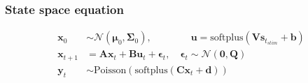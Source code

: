 \documentclass[11pt,letterpaper]{article} %
\begin{document}
\subsubsection*{State space equation}
\vspace{-0.8cm}
\begin{align*}
    \bm{x}_0 &\sim \mathcal{N}(\boldsymbol{\mu}_0, \boldsymbol{\Sigma}_0), \qquad\qquad \bm{u} = \text{softplus}\!\left(\bm{V}\bm{s}_{t_{stim}} + \bm{b}\right) \\
    \bm{x}_{t+1} &= \bm{A}\bm{x}_t + \bm{B}\bm{u}_t + \boldsymbol{\epsilon}_t, \quad \boldsymbol{\epsilon}_t \sim \mathcal{N}(\bm{0}, \bm{Q}) \\
    \bm{y}_t &\sim \text{Poisson}\!\left(\text{softplus}\!\left(\bm{C}\bm{x}_t + \bm{d}\right)\right)
\end{align*}
\vspace{-0.3cm}
\end{document}
